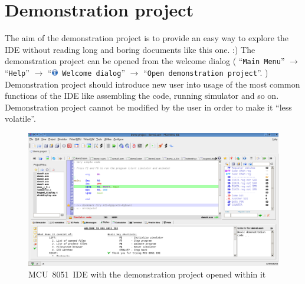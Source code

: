 \documentclass[a4paper,twoside,12pt]{book}
\newcommand{\menuitem}[1]{\texttt{#1}}
\begin{document}
	\section{Demonstration project}
		The aim of the demonstration project is to provide an easy way to explore the IDE without reading long and boring documents like this one. :) The demonstration project can be opened from the welcome dialog ( ``\menuitem{Main Menu}'' $\rightarrow$ ``\menuitem{Help}'' $\rightarrow$ ``\includegraphics[height=8pt]{img/messagebox_info.png}~\menuitem{Welcome dialog}'' $\rightarrow$ ``\menuitem{Open demonstration project}''. ) Demonstration project should introduce new user into usage of the most common functions of the IDE like assembling the code, running simulator and so on. Demonstration project cannot be modified by the user in order to make it ``less volatile''.
		\begin{figure}[h!]
			\centering{}
			\includegraphics[width=\textwidth]{img/024.png}
			\caption{MCU~8051~IDE with the demonstration project opened within it}
		\end{figure}
\end{document}
